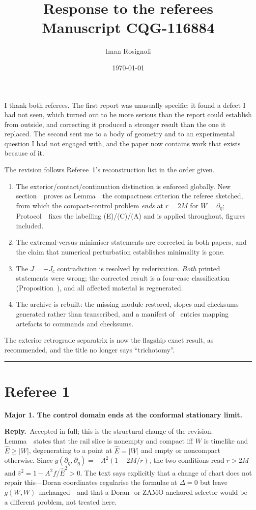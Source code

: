 \documentclass[11pt]{article}
\title{\vspace{-1.6cm}Response to the referees\\[2pt]
\large Manuscript CQG-116884}
\author{Iman Rosignoli}
\date{\today}
\newcommand{\reply}{\par\noindent\textbf{Reply.}\ }
\newcommand{\R}[1]{\par\medskip\noindent\textbf{#1}\par\nopagebreak}
\begin{document}
\maketitle
\thispagestyle{empty}

\noindent I thank both referees. The first report was unusually specific: it found a
defect I had not seen, which turned out to be more serious than the report could
establish from outside, and correcting it produced a stronger result than the one it
replaced. The second sent me to a body of geometry and to an experimental question I
had not engaged with, and the paper now contains work that exists because of it.

The revision follows Referee~1's reconstruction list in the order given.

\begin{enumerate}[leftmargin=1.4em,itemsep=1pt]
\item The exterior/contact/continuation distinction is enforced globally. New
section~\msSecDomain\ proves as Lemma~\msLemCompact\ the compactness criterion the
referee sketched, from which the compact-control problem \emph{ends} at $r=2M$ for
$W=\partial_\eta$; Protocol~\msProtStatus\ fixes the labelling (E)/(C)/(A) and is
applied throughout, figures included.
\item The extremal-versus-minimiser statements are corrected in both papers, and the
claim that numerical perturbation establishes minimality is gone.
\item The $J=-J_c$ contradiction is resolved by rederivation. \emph{Both} printed
statements were wrong; the corrected result is a four-case classification
(Proposition~\msPropClassification), and all affected material is regenerated.
\item The archive is rebuilt: the missing module restored, slopes and checksums
generated rather than transcribed, and a manifest of \ManifestArtefacts\ entries
mapping artefacts to commands and checksums.
\end{enumerate}

\noindent The exterior retrograde separatrix is now the flagship exact result, as
recommended, and the title no longer says ``trichotomy''.

\bigskip\hrule
\section*{Referee 1}

\R{Major 1. The control domain ends at the conformal stationary limit.}
\reply Accepted in full; this is the structural change of the revision.
Lemma~\msLemCompact\ states that the rail slice is nonempty and compact iff $W$ is
timelike and $\hat E\ge|W|$, degenerating to a point at $\hat E=|W|$ and empty or
noncompact otherwise. Since $g(\partial_\eta,\partial_\eta)=-A^2(1-2M/r)$, the two
conditions read $r>2M$ and $\bar v^2=1-A^2f/\hat E^2>0$. The text says explicitly
that a change of chart does not repair this---Doran coordinates regularise the
formulae at $\Delta=0$ but leave $g(W,W)$ unchanged---and that a Doran- or
ZAMO-anchored selector would be a different problem, not treated here.
\end{document}
